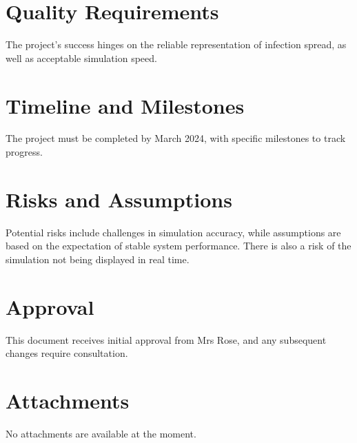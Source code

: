 \documentclass{article}
\begin{document}
	\section{Quality Requirements}
	The project's success hinges on the reliable representation of infection spread, as well as acceptable simulation speed.
	
	\section{Timeline and Milestones}
	The project must be completed by March 2024, with specific milestones to track progress.
	
	\section{Risks and Assumptions}
	Potential risks include challenges in simulation accuracy, while assumptions are based on the expectation of stable system performance. There is also a risk of the simulation not being displayed in real time.
	
	\section{Approval}
	This document receives initial approval from Mrs Rose, and any subsequent changes require consultation.
	
	\section{Attachments}
	No attachments are available at the moment.
	
\end{document}
